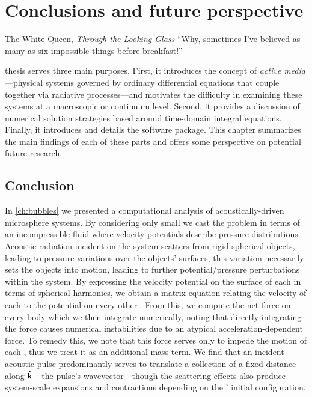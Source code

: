\chapter{\label{ch:conclusions}Conclusions and future perspective}

\begin{frontquote}{The White Queen, \emph{Through the Looking Glass}}
  ``Why, sometimes I've believed as many as six impossible things before breakfast!''
\end{frontquote}

 thesis serves three main purposes.
First, it introduces the concept of \emph{active media}---physical systems governed by ordinary differential equations that couple together via radiative processes---and motivates the difficulty in examining these systems at a macroscopic or continuum level.
Second, it provides a discussion of numerical solution strategies based around time-domain integral equations.
Finally, it introduces and details the \QuEST{} software package.
This chapter summarizes the main findings of each of these parts and offers some perspective on potential future research. 

\section{Conclusion}

In \cref{ch:bubbles} we presented a computational analysis of acoustically-driven microsphere systems.
By considering only small \bubbles{} we cast the problem in terms of an incompressible fluid where velocity potentials describe pressure distributions.
Acoustic radiation incident on the system scatters from rigid spherical objects, leading to pressure variations over the objects' surfaces; this variation necessarily sets the objects into motion, leading to further potential/pressure perturbations within the system.
By expressing the velocity potential on the surface of each \bubble{} in terms of spherical harmonics, we obtain a matrix equation relating the velocity of each \bubble{} to the potential on every other \bubble{}.
From this, we compute the net force on every body which we then integrate numerically, noting that directly integrating the force causes numerical instabilities due to an atypical acceleration-dependent force.
To remedy this, we note that this force serves only to impede the motion of each \bubble{}, thus we treat it as an additional mass term.
We find that an incident acoustic pulse predominantly serves to translate a collection of \bubbles{} a fixed distance along $\vu{k}$---the pulse's wavevector---though the scattering effects also produce system-scale expansions and contractions depending on the \bubbles' initial configuration.

